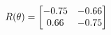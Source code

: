 \documentclass[preview]{standalone}
\begin{document}
\begin{align*}
\special{dvisvgm:raw <g id='unique000'>}R(\theta) = \begin{bmatrix}-0.75 & -0.66\\0.66 & -0.75\end{bmatrix}\special{dvisvgm:raw </g>}
\end{align*}
\end{document}
